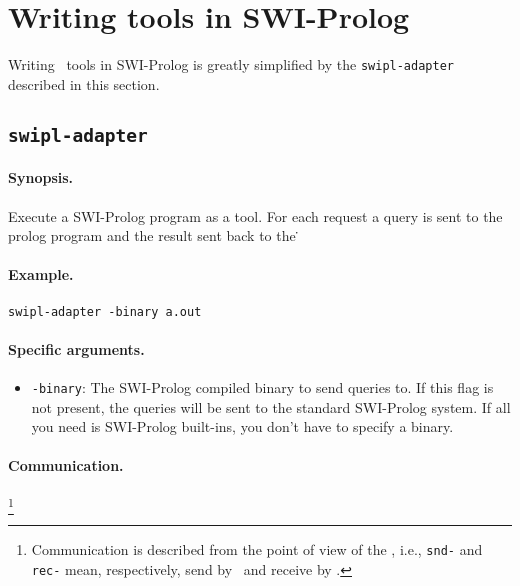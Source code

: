 
%
%
\section{Writing tools in SWI-Prolog}

Writing \TB\ tools in SWI-Prolog is greatly simplified by the
{\tt swipl-adapter} described in this section.

\subsection{\tt swipl-adapter}

\paragraph{Synopsis.} Execute a SWI-Prolog program as a tool. For each request
a query is sent to the prolog program and the result sent back to the \TB\.

\paragraph{Example.} {\tt swipl-adapter -binary a.out}

\paragraph{Specific arguments.}
\begin{itemize}
\item {\tt -binary}: The SWI-Prolog compiled binary to send queries to.
If this flag is not present, the queries will be sent to the standard
SWI-Prolog system. If all you need is SWI-Prolog built-ins, you don't have
to specify a binary.
\end{itemize}

\paragraph{Communication.} \hspace{-0.3cm}\footnote{Communication is described
from the point of view of the \TB, i.e., {\tt snd-} and {\tt rec-}
mean, respectively, send by \TB\ and receive by \TB.}

